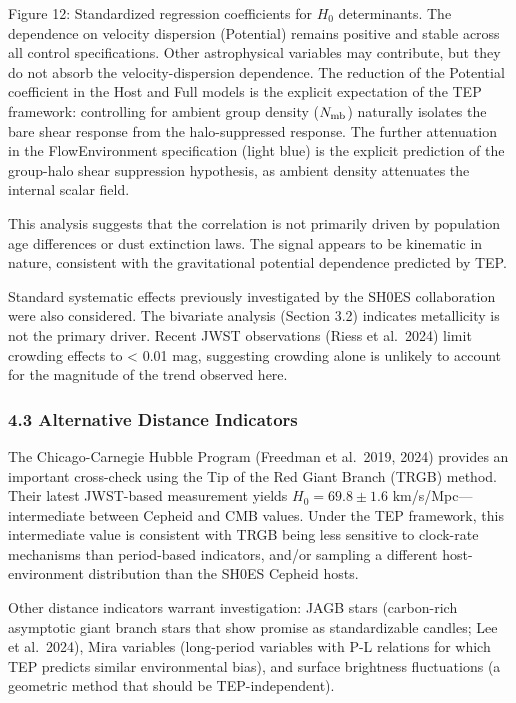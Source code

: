 \documentclass[
]{article}
\begin{document}
Figure 12: Standardized regression coefficients for \(H_0\)
determinants. The dependence on velocity dispersion (Potential) remains
positive and stable across all control specifications. Other
astrophysical variables may contribute, but they do not absorb the
velocity-dispersion dependence. The reduction of the Potential
coefficient in the Host and Full models is the explicit expectation of
the TEP framework: controlling for ambient group density
(\(N_{\rm mb}\)) naturally isolates the bare shear response from the
halo-suppressed response. The further attenuation in the FlowEnvironment
specification (light blue) is the explicit prediction of the group-halo
shear suppression hypothesis, as ambient density attenuates the internal
scalar field.

This analysis suggests that the correlation is not primarily driven by
population age differences or dust extinction laws. The signal appears
to be kinematic in nature, consistent with the gravitational potential
dependence predicted by TEP.

Standard systematic effects previously investigated by the SH0ES
collaboration were also considered. The bivariate analysis (Section 3.2)
indicates metallicity is not the primary driver. Recent JWST
observations (Riess et al.~2024) limit crowding effects to \textless{}
0.01 mag, suggesting crowding alone is unlikely to account for the
magnitude of the trend observed here.

\subsubsection{4.3 Alternative Distance
Indicators}\label{alternative-distance-indicators}

The Chicago-Carnegie Hubble Program (Freedman et al.~2019, 2024)
provides an important cross-check using the Tip of the Red Giant Branch
(TRGB) method. Their latest JWST-based measurement yields \(H_0 = 69.8
\pm 1.6\) km/s/Mpc---intermediate between Cepheid and CMB values. Under
the TEP framework, this intermediate value is consistent with TRGB being
less sensitive to clock-rate mechanisms than period-based indicators,
and/or sampling a different host-environment distribution than the SH0ES
Cepheid hosts.

Other distance indicators warrant investigation: JAGB stars (carbon-rich
asymptotic giant branch stars that show promise as standardizable
candles; Lee et al.~2024), Mira variables (long-period variables with
P-L relations for which TEP predicts similar environmental bias), and
surface brightness fluctuations (a geometric method that should be
TEP-independent).
\end{document}
